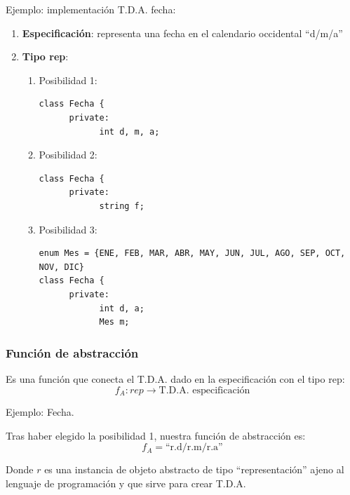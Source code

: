 \documentclass[10pt,a4paper,spanish]{report}
\begin{document}
\noindent
Ejemplo: implementación T.D.A. fecha:
\begin{enumerate}[$\spadesuit$]
\item \textbf{\textcolor[rgb]{0.8,0.2,0.2}{Especificación}}: representa una fecha en el calendario occidental ``d/m/a''
\item \textbf{\textcolor[rgb]{0.8,0.2,0.2}{Tipo rep}}:
\begin{enumerate}[$\heartsuit$]
\item Posibilidad 1:
\begin{verbatim}
class Fecha {
      private:
            int d, m, a;
\end{verbatim}
\item Posibilidad 2:
\begin{verbatim}
class Fecha {
      private:
            string f;
\end{verbatim}
\item Posibilidad 3:
\begin{verbatim}
enum Mes = {ENE, FEB, MAR, ABR, MAY, JUN, JUL, AGO, SEP, OCT, NOV, DIC}
class Fecha {
      private:
            int d, a;
            Mes m;
\end{verbatim}
\end{enumerate}
\end{enumerate}

\subsubsection{\textcolor[rgb]{0.8,0.2,0.2}Función de abstracción}
\noindent
Es una función que conecta el T.D.A. dado en la especificación con el tipo rep:
\begin{displaymath}
f_{A}: rep \longrightarrow \textrm{T.D.A. especificación}
\end{displaymath}

\noindent
Ejemplo: Fecha.

\noindent
Tras haber elegido la posibilidad 1, nuestra función de abstracción es:
\begin{displaymath}
f_{A} = \textrm{``r.d/r.m/r.a''}
\end{displaymath}

\noindent
Donde $r$ es una instancia de objeto abstracto de tipo ``representación'' ajeno al lenguaje de programación y que sirve para crear T.D.A.
\end{document}
